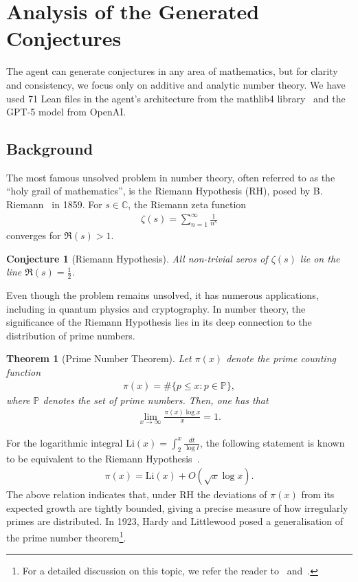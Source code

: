 \documentclass[11pt,reqno]{amsart}
\theoremstyle{plain}\newtheorem{theorem}{Theorem}[section]
\newtheorem{conjecture}{Conjecture}[section]
\numberwithin{equation}{section}
\begin{document}
\section{Analysis of the Generated Conjectures}\label{section2}
\noindent
The agent can generate conjectures in any area of mathematics, but for clarity and consistency, we focus only on additive and analytic number theory. We have used 71 Lean files in the agent's architecture from the mathlib4 library~\cite{mathlib4} and the GPT-5 model from OpenAI. %

\subsection{Background}

The most famous unsolved problem in number theory, often referred to as the “holy grail of mathematics”, is the Riemann Hypothesis (RH), posed by B. Riemann~\cite{rh} in 1859. For $s\in\mathbb{C}$, the Riemann zeta function
\begin{align*}
\zeta(s)
=\sum_{n=1}^{\infty}\frac{1}{n^s}
\end{align*}
converges for $\Re(s)>1$. 

\begin{conjecture}[Riemann Hypothesis]
All non-trivial zeros of $\zeta(s)$ lie on the line $\Re(s)=\frac{1}{2}$.
\end{conjecture}
\noindent
Even though the problem remains unsolved, it has numerous applications, including in quantum physics and cryptography. In number theory, the significance of the Riemann Hypothesis lies in its deep connection to the distribution of prime numbers.
 
\begin{theorem}[Prime Number Theorem]
Let $\pi(x)$ denote the prime counting function
\begin{align*}
\pi(x)
=\#\{p\leq x: p\in\mathbb{P}\},
\end{align*}
where $\mathbb{P}$ denotes the set of prime numbers. Then, one has that
\begin{align*}
\lim_{x\to\infty}\frac{\pi(x)\log x}{x}=1.    
\end{align*}
\end{theorem}
\noindent
For the logarithmic integral $\mathrm{Li}(x)=\int_{2}^{x}\frac{dt}{\log t}$, the following statement is known to be equivalent to the Riemann Hypothesis~\cite{vankoch}.
\begin{align*}
\pi(x)=\mathrm{Li}(x)+O(\sqrt{x}\log x).    
\end{align*}
The above relation indicates that, under RH the deviations of $\pi(x)$ from its expected growth are tightly bounded, giving a precise measure of how irregularly primes are distributed. In 1923, Hardy and Littlewood posed a generalisation of the prime number theorem\footnote{For a detailed discussion on this topic, we refer the reader to~\cite[\S2.3]{iwanieckowlaski} and~\cite{sarnak2004}.
}.
\end{document}

